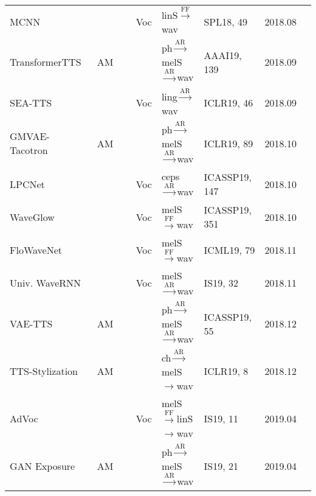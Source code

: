 \documentclass{article}
\begin{document}
\begin{center}
\begin{longtable}{l | l | l | l | l | l }
		MCNN~\citet{arik2018fast}       & ~~~~~~~~Voc & {\color{red}linS}$\stackrel{\text{FF}}{\longrightarrow}$wav         & SPL18, 49 & 2018.08     \\
		TransformerTTS~\cite{li2019neural} & AM  & {\color{blue}ph}$\stackrel{\text{AR}}{\longrightarrow}${\color{red}melS}$\stackrel{\text{AR}}{\longrightarrow}$wav  & AAAI19, 139 &  2018.09        \\
		SEA-TTS~\cite{chen2018sample} & ~~~~~~~~Voc  & {\color{blue}ling}$\stackrel{\text{AR}}{\longrightarrow}$wav  & ICLR19, 46 &  2018.09        \\
		GMVAE-Tacotron~\cite{hsu2018hierarchical} & AM  & {\color{blue}ph}$\stackrel{\text{AR}}{\longrightarrow}${\color{red}melS}$\stackrel{\text{AR}}{\longrightarrow}$wav  & ICLR19, 89 &  2018.10        \\
		LPCNet~\cite{valin2019lpcnet}                 & ~~~~~~~~Voc      & {\color{red}ceps}$\stackrel{\text{AR}}{\longrightarrow}$wav           & ICASSP19, 147 & 2018.10        \\
		WaveGlow~\cite{prenger2019waveglow}               & ~~~~~~~~Voc     & {\color{red}melS}$\stackrel{\text{FF}}{\longrightarrow}$wav   & ICASSP19, 351 & 2018.10        \\
		FloWaveNet~\cite{kim2019flowavenet}             & ~~~~~~~~Voc      & {\color{red}melS}$\stackrel{\text{FF}}{\longrightarrow}$wav          &ICML19, 79 & 2018.11        \\
		Univ. WaveRNN~\cite{lorenzo2019towards}             & ~~~~~~~~Voc      & {\color{red}melS}$\stackrel{\text{AR}}{\longrightarrow}$wav          &IS19, 32 & 2018.11        \\
		VAE-TTS~\cite{zhang2019learningb}            & AM      & {\color{blue}ph}$\stackrel{\text{AR}}{\longrightarrow}${\color{red}melS}$\stackrel{\text{AR}}{\longrightarrow}$wav          &ICASSP19, 55 & 2018.12        \\
		TTS-Stylization~\cite{ma2018neural}  & AM      & {\color{blue}ch}$\stackrel{\text{AR}}{\longrightarrow}${\color{red}melS}$\rightarrow$wav          &ICLR19, 8 & 2018.12        \\
		AdVoc~\cite{neekhara2019expediting}                  & ~~~~~~~~Voc      & {\color{red}melS}$\stackrel{\text{FF}}{\longrightarrow}${\color{red}linS}$\rightarrow$wav          &IS19, 11& 2019.04 &          \\
		GAN Exposure~\cite{guo2019new}           & AM      & {\color{blue}ph}$\stackrel{\text{AR}}{\longrightarrow}${\color{red}melS}$\stackrel{\text{AR}}{\longrightarrow}$wav           &IS19, 21& 2019.04  &      \\

\end{longtable}
\end{center}
\end{document}
